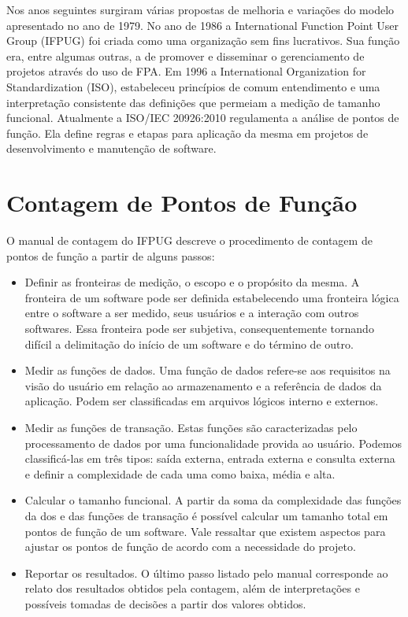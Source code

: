 Nos anos seguintes surgiram várias propostas de melhoria e variações do modelo apresentado no ano de 1979. No ano de 1986 a International Function Point User Group (IFPUG) foi criada como uma organização sem fins lucrativos. Sua função era, entre algumas outras, a de promover e disseminar o gerenciamento de projetos através do uso de FPA. Em 1996 a International Organization for Standardization (ISO), estabeleceu princípios de comum entendimento e uma interpretação consistente das  definições que permeiam a medição de tamanho funcional. Atualmente a ISO/IEC 20926:2010 regulamenta a análise de pontos de função. Ela define regras e etapas para aplicação da mesma em projetos de desenvolvimento e manutenção de software.

\section{Contagem de Pontos de Função}

O manual de contagem do IFPUG descreve o procedimento de contagem de pontos de função a partir de alguns passos:

\begin{itemize}

\item Definir as fronteiras de medição, o escopo e o propósito da mesma. A fronteira de um software pode ser definida estabelecendo uma fronteira lógica entre o software a ser medido, seus usuários e a interação com outros softwares. Essa fronteira pode ser subjetiva, consequentemente tornando difícil a delimitação do início de um software e do término de outro.

\item Medir as funções de dados. Uma função de dados refere-se aos requisitos na visão do usuário em relação ao armazenamento e a referência de dados da aplicação. Podem ser classificadas em arquivos lógicos interno e externos.

\item Medir as funções de transação. Estas funções são caracterizadas pelo processamento de dados por uma funcionalidade provida ao usuário. Podemos classificá-las em três tipos: saída externa, entrada externa e consulta externa e definir a complexidade de cada uma como baixa, média e alta.

\item Calcular o tamanho funcional. A partir da soma da complexidade das funções da dos e das funções de transação é possível calcular um tamanho total em pontos de função de um software. Vale ressaltar que existem aspectos para ajustar os pontos de função de acordo com a necessidade do projeto.

\item Reportar os resultados. O último passo listado pelo manual corresponde ao relato dos resultados obtidos pela contagem, além de interpretações e possíveis tomadas de decisões a partir dos valores obtidos.

\end{itemize}

